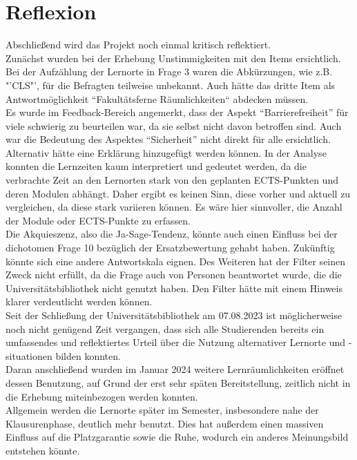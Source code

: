 \documentclass[11pt, a4paper]{article}
\begin{document}
\section{Reflexion}
Abschließend wird das Projekt noch einmal kritisch reflektiert. \\
Zunächst wurden bei der Erhebung Unstimmigkeiten mit den Items ersichtlich.
Bei der Aufzählung der Lernorte in Frage 3 waren die Abkürzungen, wie z.B. "'CLS"', für die Befragten teilweise unbekannt. Auch hätte das dritte Item als Antwortmöglichkeit “Fakultätsferne Räumlichkeiten“ abdecken müssen. \\
Es wurde im Feedback-Bereich angemerkt, dass der Aspekt “Barrierefreiheit” für viele schwierig zu beurteilen war, da sie selbst nicht davon betroffen sind. Auch war die Bedeutung des Aspektes “Sicherheit” nicht direkt für alle ersichtlich. Alternativ hätte eine Erklärung hinzugefügt werden können.
In der Analyse konnten die Lernzeiten kaum interpretiert und gedeutet werden, da die verbrachte Zeit an den Lernorten stark von den geplanten ECTS-Punkten und deren Modulen abhängt. Daher ergibt es keinen Sinn, diese vorher und aktuell zu vergleichen, da diese stark variieren können. Es wäre hier sinnvoller, die Anzahl der Module oder ECTS-Punkte zu erfassen.\\
Die Akquieszenz, also die Ja-Sage-Tendenz, könnte auch einen Einfluss bei der dichotomen Frage 10 bezüglich der Ersatzbewertung gehabt haben. Zukünftig könnte sich eine andere Antwortskala eignen. Des Weiteren hat der Filter seinen Zweck nicht erfüllt, da die Frage auch von Personen beantwortet wurde, die die Universitätsbibliothek nicht genutzt haben. Den Filter hätte mit einem Hinweis klarer verdeutlicht werden können.\\
Seit der Schließung der Universitätsbibliothek am 07.08.2023 ist möglicherweise noch nicht genügend Zeit vergangen, dass sich alle Studierenden bereits ein umfassendes und reflektiertes Urteil über die Nutzung alternativer Lernorte und -situationen bilden konnten. \\
Daran anschließend wurden im Januar 2024 weitere Lernräumlichkeiten eröffnet dessen Benutzung, auf Grund der erst sehr späten Bereitstellung, zeitlich nicht in die Erhebung miteinbezogen werden konnten. \\
Allgemein werden die Lernorte später im Semester, insbesondere nahe der Klausurenphase, deutlich mehr benutzt. Dies hat außerdem einen massiven Einfluss auf die Platzgarantie sowie die Ruhe, wodurch ein anderes Meinungsbild entstehen könnte.\\
\end{document}
